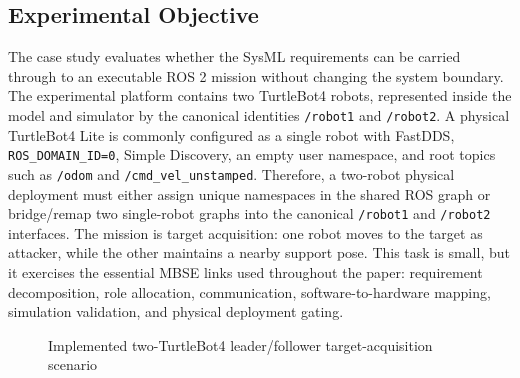 \documentclass{ieeeaccess}
\begin{document}
\subsection{Experimental Objective}
The case study evaluates whether the SysML requirements can be carried through to an executable ROS 2 mission without changing the system boundary. The experimental platform contains two TurtleBot4 robots, represented inside the model and simulator by the canonical identities \texttt{/robot1} and \texttt{/robot2}. A physical TurtleBot4 Lite is commonly configured as a single robot with FastDDS, \texttt{ROS\_DOMAIN\_ID=0}, Simple Discovery, an empty user namespace, and root topics such as \texttt{/odom} and \texttt{/cmd\_vel\_unstamped}. Therefore, a two-robot physical deployment must either assign unique namespaces in the shared ROS graph or bridge/remap two single-robot graphs into the canonical \texttt{/robot1} and \texttt{/robot2} interfaces. The mission is target acquisition: one robot moves to the target as attacker, while the other maintains a nearby support pose. This task is small, but it exercises the essential MBSE links used throughout the paper: requirement decomposition, role allocation, communication, software-to-hardware mapping, simulation validation, and physical deployment gating.

\begin{figure}[H]
  \centering
  \caption{Implemented two-TurtleBot4 leader/follower target-acquisition scenario}
  \label{fig_two_tb4_case}
\end{figure}
\end{document}
